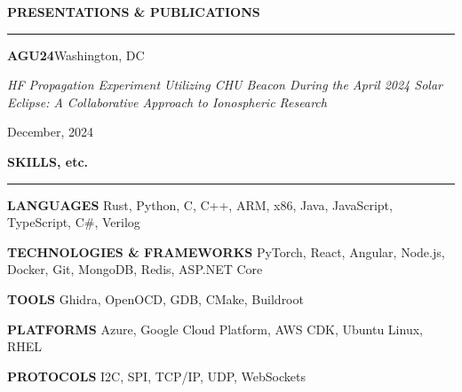 \documentclass[notitlepage,10pt,a4paper]{article}
\newenvironment{resumesection}[1]{
    \header{#1}
}{}
\newcommand{\labela}[1]{
    \small\textbf{\MakeUppercase{#1}}
}
\newcommand{\header}[1]{
    \vspace{2pt}
    \textcolor{accent1}{\Large \textbf{#1}}
    \vspace{6pt}\hrule\vspace{4pt}
}
\newcommand{\thingsep}{
    \vspace{4pt}
}
\begin{document}
\begin{resumesection}{PRESENTATIONS \& PUBLICATIONS}
    \textcolor{accent2}{\textbf{\large AGU24}}\hfill Washington, DC\\
     \begin{minipage}[t]{.8\textwidth}
        \raggedright
        \textit{\small HF Propagation Experiment Utilizing CHU Beacon During the April 2024 Solar Eclipse: A Collaborative Approach to Ionospheric Research} \\
    \end{minipage}%
    \begin{minipage}[t]{.2\textwidth}
        \raggedleft
        \hfill {\small December, 2024} \\
    \end{minipage}
    \thingsep

\end{resumesection}

\begin{resumesection}{SKILLS, etc.}
    \labela{Languages} Rust, Python, C, C++, ARM, x86, Java, JavaScript, TypeScript, C\#, Verilog

    \labela{Technologies \& Frameworks} PyTorch, React, Angular, Node.js, Docker, Git, MongoDB, Redis, ASP.NET Core

    \labela{Tools} Ghidra, OpenOCD, GDB, CMake, Buildroot

    \labela{Platforms} Azure, Google Cloud Platform, AWS CDK, Ubuntu Linux, RHEL

    \labela{Protocols} I2C, SPI, TCP/IP, UDP, WebSockets

\end{resumesection}
\end{document}
